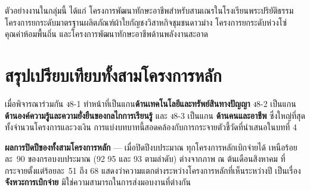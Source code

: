 ตัวอย่างงานในกลุ่มนี้ ได้แก่ โครงการพัฒนาทักษะอาชีพสำหรับสามเณรในโรงเรียนพระปริยัติธรรม
โครงการยกระดับมาตรฐานผลิตภัณฑ์ผ้าใยกัญชงวิสาหกิจชุมชนดาวม่าง
โครงการยกระดับห่วงโซ่คุณค่าห้อมพื้นถิ่น
และโครงการพัฒนาทักษะอาชีพด้านพลังงานสะอาด

\section{สรุปเปรียบเทียบทั้งสามโครงการหลัก}
เมื่อพิจารณาร่วมกัน ง8-1 ทำหน้าที่เป็นแกน\textbf{ด้านเทคโนโลยีและทรัพย์สินทางปัญญา}
ง8-2 เป็นแกน\textbf{ด้านองค์ความรู้และความยั่งยืนของกลไกการเรียนรู้} และ ง8-3 เป็นแกน
\textbf{ด้านคนและอาชีพ} ซึ่งใหญ่ที่สุดทั้งจำนวนโครงการและวงเงิน
การแบ่งบทบาทนี้สอดคล้องกับการกระจายตัวชี้วัดที่นำเสนอในบทที่ 4


\begin{tipbox}
\textbf{ผลการปิดปีของทั้งสามโครงการหลัก} --- เมื่อปิดปีงบประมาณ ทุกโครงการหลักเบิกจ่ายได้
เหนือร้อยละ~90 ของกรอบงบประมาณ (92 95 และ 93 ตามลำดับ) ต่างจากภาพ ณ ต้นเดือนสิงหาคม
ที่กระจายตั้งแต่ร้อยละ~51 ถึง 68 แสดงว่าความแตกต่างระหว่างโครงการหลักที่เห็นระหว่างปี
เป็นเรื่อง\textbf{จังหวะการเบิกจ่าย} มิใช่ความสามารถในการส่งมอบงานที่ต่างกัน
\end{tipbox}
